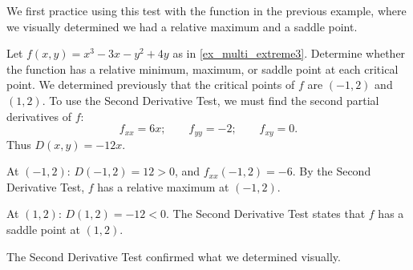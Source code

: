 We first practice using this test with the function in the previous example, where we visually determined we had a relative maximum and a saddle point.

\begin{example}\label{ex_multi_extreme4}
Let $f(x,y) = x^3-3x-y^2+4y$ as in \autoref{ex_multi_extreme3}. Determine whether the function has a relative minimum, maximum, or saddle point at each critical point.
\solution
We determined previously that the critical points of $f$ are $(-1,2)$ and $(1,2)$. To use the Second Derivative Test, we must find the second partial derivatives of $f$:
\[f_{xx} = 6x;\qquad f_{yy} = -2;\qquad f_{xy} = 0.\]
Thus $D(x,y) = -12x$. 

At $(-1,2)$: $D(-1,2) = 12>0$, and $f_{xx}(-1,2) = -6$. By the Second Derivative Test, $f$ has a relative maximum at $(-1,2)$.

At $(1,2)$: $D(1,2) = -12 <0$. The Second Derivative Test states that $f$ has a saddle point at $(1,2)$.

The Second Derivative Test confirmed what we determined visually.
\end{example}

